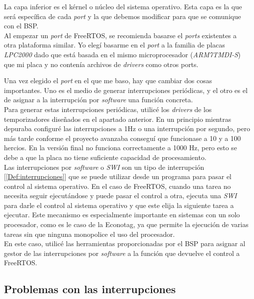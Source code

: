 La capa inferior es el kérnel o núcleo del sistema operativo. Esta capa es la que será específica de cada \emph{port} y la que debemos modificar para que se comunique con el BSP.\\

Al empezar un \emph{port} de FreeRTOS, se recomienda basarse el \emph{ports} existentes a otra plataforma similar. Yo elegí basarme en el \emph{port} a la familia de placas \emph{LPC2000} dado que está basada en el mismo microprocesador (\emph{ARM7TMDI-S}) que mi placa y no contenía archivos de \emph{drivers} como otros ports. 

Una vez elegido el \emph{port} en el que me baso, hay que cambiar dos cosas importantes. Uno es el medio de generar interrupciones periódicas, y el otro es el de asignar a la interrupción por \emph{software} una función concreta.\\

Para generar estas interrupciones periódicas, utilicé los \emph{drivers} de los temporizadores diseñados en el apartado anterior. En un principio mientras depuraba configuré las interrupciones a 1Hz o una interrupción por segundo, pero más tarde conforme el proyecto avanzaba conseguí que funcionase a 10 y a 100 hercios. En la versión final no funciona correctamente a 1000 Hz, pero esto se debe a que la placa no tiene suficiente capacidad de procesamiento.\\

Las interrupciones por \emph{software} o \emph{SWI} son un tipo de interrupción [\ref{Def:interrupciones}] que se puede utilizar desde un programa para pasar el control al sistema operativo. En el caso de FreeRTOS, cuando una tarea no necesita seguir ejecutándose y puede pasar el control a otra, ejecuta una \emph{SWI} para darle el control al sistema operativo y que este elija la siguiente tarea a ejecutar. Este mecanismo es especialmente importante en sistemas con un solo procesador, como es le caso de la Econotag, ya que permite la ejecución de varias tareas sin que ninguna monopolice el uso del procesador.\\

En este caso, utilicé las herramientas proporcionadas por el BSP para asignar al gestor de las interrupciones por \emph{software} a la función que devuelve el control a FreeRTOS.

\subsection{Problemas con las interrupciones}

